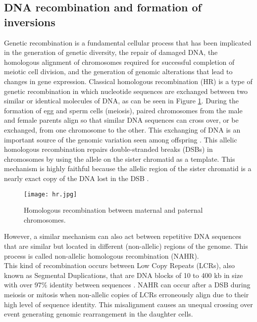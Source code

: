 \subsection{DNA recombination and formation of inversions}

Genetic recombination is a fundamental cellular process that has been implicated in the generation of genetic diversity, the repair of damaged DNA, the homologous alignment of chromosomes required for successful completion of meiotic cell division, and the generation of genomic alterations that lead to changes in gene expression. Classical homologous recombination (HR) is a type of genetic recombination in which nucleotide sequences are exchanged between two similar or identical molecules of DNA, as can be seen in Figure \ref{fig:hr}. During the formation of egg and sperm cells (meiosis), paired chromosomes from the male and female parents align so that similar DNA sequences can cross over, or be exchanged, from one chromosome to the other. This exchanging of DNA is an important source of the genomic variation seen among offspring \cite{noauthor_homologous_nodate}.
This allelic homologous recombination repairs double-stranded breaks (DSBs) in chromosomes by using the allele on the sister chromatid as a template. This mechanism is highly faithful because the allelic region of the sister chromatid is a nearly exact copy of the DNA lost in the DSB \cite{parks_detecting_2015}. 

\begin{figure}[h]

  \centering
    \texttt{[image: hr.jpg]}

  \caption{Homologous recombination between maternal and paternal chromosomes.}
  \label{fig:hr}
\end{figure}

However, a similar mechanism can also act between repetitive DNA sequences that are similar but located in different (non-allelic) regions of the genome. This process is called non-allelic homologous recombination (NAHR). \\
This kind of recombination occurs between Low Copy Repeats (LCRs), also known as Segmental Duplications, that are DNA blocks of 10 to 400 kb in size with over
97\% identity between sequences \cite{burssed_mechanisms_2022}. NAHR can occur after a DSB during meiosis or mitosis when non-allelic copies of LCRs erroneously align due to their high level of sequence identity. This misalignment causes an unequal crossing over event generating genomic rearrangement in the daughter cells. 

